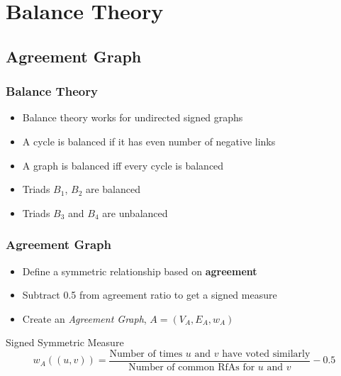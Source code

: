\documentclass{beamer}
\begin{document}
\section{Balance Theory}

\subsection{Agreement Graph}
\begin{frame}
    \frametitle{Balance Theory}
    \begin{itemize}
        \item Balance theory works for undirected signed graphs
        \item A cycle is balanced if it has even number of negative links
        \item A graph is balanced iff every cycle is balanced
        \item Triads $B_1$, $B_2$ are balanced
        \item Triads $B_3$ and $B_4$ are unbalanced
    \end{itemize}
    \begin{figure}
        \centering
        \scalebox{0.75}{}
    \end{figure}

\end{frame}

\begin{frame}
    \frametitle{Agreement Graph}
    \begin{itemize}
        \item Define a symmetric relationship based on \textbf{agreement} 
        \item Subtract 0.5 from agreement ratio to get a signed measure
        \item Create an \textit{Agreement Graph}, $A=(V_A,E_A,w_A)$
    \end{itemize}
    \begin{block}{Signed Symmetric Measure}
        $$w_{A}((u,v)) = \frac{\text{Number of times } u \text{ and } v \text{ have voted similarly}}{\text{Number of common RfAs for } u \text{ and } v} -0.5$$
    \end{block}

\end{frame}
\end{document}
